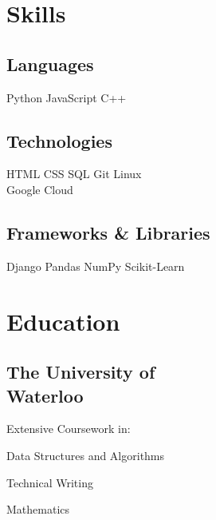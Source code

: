 \documentclass[12pt]{deedy-resume-openfont}
\begin{document}
\begin{minipage}[t]{0.32\textwidth} 


\section{Skills}
\subsection{Languages}
Python \textbullet{} JavaScript  \textbullet{} C++ 
\vspace{2mm}
\subsection{Technologies}
HTML \textbullet{} CSS \textbullet{} SQL \textbullet{} Git \textbullet{} Linux \textbullet{} \\  Google Cloud
\vspace{2mm}
\subsection{Frameworks \& Libraries}
Django\textbullet{} Pandas \textbullet{} NumPy \textbullet{} Scikit-Learn


\sectionsep



\section{Education} 

\subsection{The University of \\Waterloo}
\vspace{2mm}
Extensive Coursework in: 
\vspace{3mm}
\begin{tightemize}
\item Data Structures and Algorithms
\item Technical Writing
\item Mathematics
\end{tightemize}
\sectionsep


\end{minipage}
\end{document}
